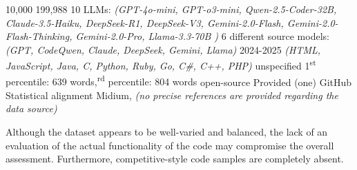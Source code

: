 \expandafter\def\csname CodeMirageHumanCode\endcsname{10,000}
\expandafter\def\csname CodeMirageLLMCode\endcsname{199,988}
\expandafter\def\csname CodeMirageNumLLMs\endcsname{10 LLMs: \textit{(GPT-4o-mini, GPT-o3-mini, Qwen-2.5-Coder-32B, Claude-3.5-Haiku, DeepSeek-R1, DeepSeek-V3,  Gemini-2.0-Flash,  Gemini-2.0-Flash-Thinking, Gemini-2.0-Pro, Llama-3.3-70B )}}
\expandafter\def\csname CodeMirageLLMDiversity\endcsname{6 different source models: \textit{(GPT, CodeQwen, Claude, DeepSeek, Gemini, Llama) }}
\expandafter\def\csname CodeMirageCurrentUse\endcsname{2024-2025}
\expandafter\def\csname CodeMirageLanguages\endcsname{\textit{(HTML, JavaScript, Java, C, Python, Ruby, Go, C\#, C++, PHP)}}
\expandafter\def\csname CodeMirageCodeTypes\endcsname{unspecified}
\expandafter\def\csname CodeMirageCodeSize\endcsname{1\textsuperscript{st} percentile: 639 words,\textsuperscript{rd} percentile: 804  words}
\expandafter\def\csname CodeMirageCodeContext\endcsname{open-source}
\expandafter\def\csname CodeMiragePrompts\endcsname{Provided (one)}
\expandafter\def\csname CodeMirageSources\endcsname{GitHub}
\expandafter\def\csname CodeMirageCodeQuality\endcsname{Statistical alignment}
\expandafter\def\csname CodeMirageReliability\endcsname{Midium, \textit{(no precise references are provided regarding the data source)}}




Although the dataset appears to be well-varied and balanced, 
the lack of an evaluation of the actual functionality of the code 
may compromise the overall assessment. Furthermore, 
competitive-style code samples are completely absent.